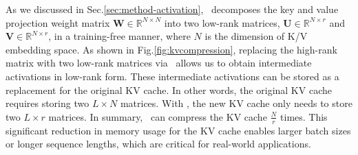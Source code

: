 As we discussed in Sec.\ref{sec:method-activation}, \asvd~decomposes the key and value projection weight matrix $\mathbf{W}\in \mathbb{R}^{N\times N}$ into two low-rank matrices, $\mathbf{U}\in \mathbb{R}^{N\times r}$ and $\mathbf{V}\in \mathbb{R}^{N\times r}$, in a training-free manner, where $N$ is the dimension of K/V embedding space.
As shown in Fig.\ref{fig:kvcompression}, replacing the high-rank matrix with two low-rank matrices via \asvd~allows us to obtain intermediate activations in low-rank form. These intermediate activations can be stored as a replacement for the original KV cache.
In other words, the original KV cache requires storing two $L\times N$ matrices. With \asvd, the new KV cache only needs to store two $L\times r$ matrices. 
In summary, \asvd~can compress the KV cache $\frac{N}{r}$ times.
This significant reduction in memory usage for the KV cache enables larger batch sizes or longer sequence lengths, which are critical for real-world applications.




